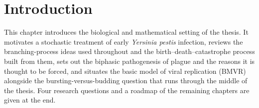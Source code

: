 \chapter{Introduction}
\label{ch:introduction}

\begin{chapterabstract}
\noindent
This chapter introduces the biological and mathematical setting of the thesis.
It motivates a stochastic treatment of early \textit{Yersinia pestis}
infection, reviews the branching-process ideas used throughout and the
birth--death--catastrophe process built from them, sets out the biphasic
pathogenesis of plague and the reasons it is thought to be forced, and situates
the basic model of viral replication (BMVR) alongside the
bursting-versus-budding question that runs through the middle of the thesis.
Four research questions and a roadmap of the remaining chapters are given at
the end.
\end{chapterabstract}










